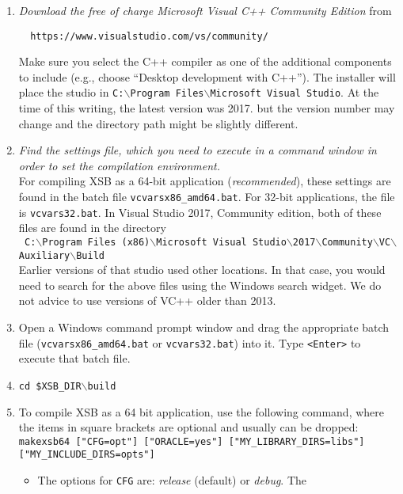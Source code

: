 \begin{enumerate}
\item \emph{Download the free of charge Microsoft Visual C++ Community
    Edition} from
\begin{verbatim}
  https://www.visualstudio.com/vs/community/
\end{verbatim}
Make sure you select the C++ compiler as one of the additional components
to include (e.g., choose ``Desktop development with C++''). The installer will place the studio in
\texttt{C:$\backslash$Program Files$\backslash$Microsoft Visual Studio}.
At the time of this writing, the latest version was 2017.
but the version number may change and the directory path might be slightly
different.
\item \emph{Find the settings file, which you need to execute in a command
  window in order to set the compilation environment.}\\
  For compiling XSB as a 64-bit application (\emph{recommended}), these settings are
  found in the batch file \texttt{vcvarsx86\_amd64.bat}. For 32-bit
  applications, the file is \texttt{vcvars32.bat}.
  In Visual Studio 2017, Community edition, both of these files
  are found in the directory
  \vspace{1mm}\\
\noindent
  {\small
    \texttt{
      C:$\backslash$Program Files\,(x86)$\backslash$Microsoft Visual Studio$\backslash$2017$\backslash$Community$\backslash$VC$\backslash$Auxiliary$\backslash$Build
    }
  }
\\
    Earlier versions of that studio used other locations. In that case, you
    would need to search for the above files using the Windows search widget.
    We do not advice to use versions of VC++ older than 2013.
  \item
    Open a Windows command prompt window and
    drag the appropriate batch file (\texttt{vcvarsx86\_amd64.bat} or
    \texttt{vcvars32.bat}) into it. Type \texttt{<Enter>} to execute that
    batch file. 
\item
   {\tt cd \$XSB\_DIR$\backslash$build}  
\item
To compile XSB as a 64 bit application, use the following command, where the
items in square brackets are optional and usually can be dropped:\\
  {\small{\tt makexsb64\,["CFG=opt"]\,["ORACLE=yes"]\,["MY\_LIBRARY\_DIRS=libs"]\,["MY\_INCLUDE\_DIRS=opts"]}}
  \begin{itemize}
  \item The options for {\tt CFG} are: \emph{release} (default) or \emph{debug}.  The

\end{itemize}
\end{enumerate}
